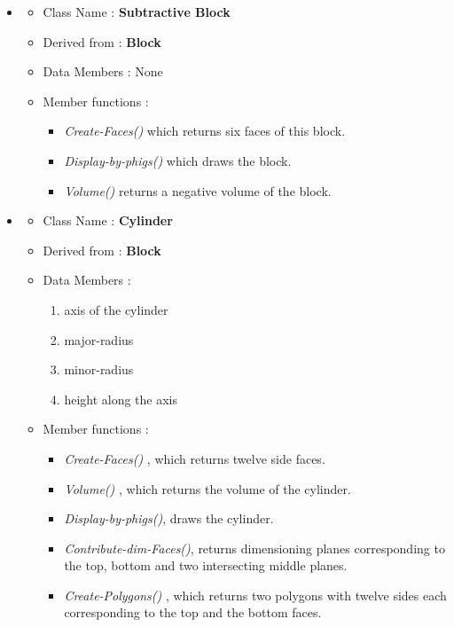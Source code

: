 		\begin{itemize}

		\item
        \begin{itemize}
        \item   Class Name :    {\bf Subtractive Block}
        \item   Derived from :  {\bf Block}
        \item   Data Members :	None
		\item	Member functions :

				\begin{itemize}
				\item
				{\em Create-Faces()	} which returns six faces of this block.
				\item
				{\em Display-by-phigs()} which draws the block.
				\item
				{\em Volume()} returns a negative volume of the block.
				\end{itemize}
		\end{itemize}

		\item

        \begin{itemize}
        \item   Class Name :    {\bf Cylinder}
        \item   Derived from :  {\bf Block}
        \item   Data Members :
                \begin{enumerate}
                \item
                axis of the cylinder
                \item
                major-radius
                \item
                minor-radius
                \item
                height along the axis
                \end{enumerate}
		\item	Member functions :
                \begin{itemize}
                \item
                {\em Create-Faces() }, which returns twelve side faces.
                \item
                {\em Volume() }, which returns the volume of the cylinder.
                \item
                {\em Display-by-phigs()}, draws the cylinder.
				\item
				{\em Contribute-dim-Faces()}, returns dimensioning planes
				corresponding to the top, bottom and two intersecting middle
				planes.
                \item
                {\em Create-Polygons() }, which returns two polygons with
                twelve sides each corresponding to the top and the bottom
				faces.
                \end{itemize}
        \end{itemize}



\end{itemize}
